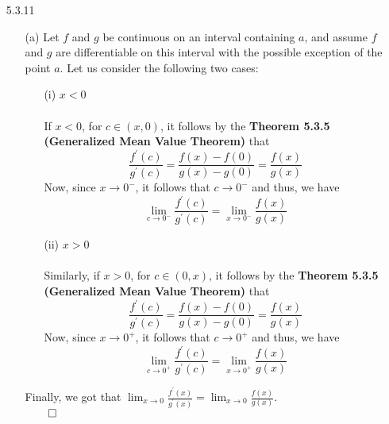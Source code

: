 \documentclass[11pt]{article}
\begin{document}
\begin{itemize}
    \newpage

    \item[5.3.11]
        \begin{itemize}
            \item[(a)]
                Let $f$ and $g$ be continuous on an interval containing $a$,
                and assume $f$ and $g$ are differentiable on this interval with
                the possible exception of the point $a$. Let us consider the
                following two cases:
                \begin{itemize}
                    \item[(i)]
                        $x < 0$
                        \\
                        \\
                        If $x < 0$, for $c \in (x, 0)$, it follows by the
                        \textbf{Theorem 5.3.5 (Generalized Mean Value Theorem)}
                        that
                        \begin{equation*}
                            \frac{f^\prime(c)}{g^\prime(c)} = \frac{f(x) - f(0)}{g(x) - g(0)}
                                                            = \frac{f(x)}{g(x)}
                        \end{equation*}
                        Now, since $x \to 0^-$, it follows that $c \to 0^-$ and
                        thus, we have
                        \begin{equation*}
                            \lim_{c \to 0^-}{\frac{f^\prime(c)}{g^\prime(c)}} = \lim_{x \to 0^-}{\frac{f(x)}{g(x)}}
                        \end{equation*}

                    \item[(ii)]
                        $x > 0$
                        \\
                        \\
                        Similarly, if $x > 0$, for $c \in (0, x)$, it follows
                        by the \textbf{Theorem 5.3.5 (Generalized Mean Value
                        Theorem)} that
                        \begin{equation*}
                            \frac{f^\prime(c)}{g^\prime(c)} = \frac{f(x) - f(0)}{g(x) - g(0)}
                                                            = \frac{f(x)}{g(x)}
                        \end{equation*}
                        Now, since $x \to 0^+$, it follows that $c \to 0^+$ and
                        thus, we have
                        \begin{equation*}
                            \lim_{c \to 0^+}{\frac{f^\prime(c)}{g^\prime(c)}} = \lim_{x \to 0^+}{\frac{f(x)}{g(x)}}
                        \end{equation*}
                \end{itemize}
                Finally, we got that $\lim_{x \to
                0}{\frac{f^\prime(x)}{g^\prime(x)}} = \lim_{x \to
                0}\frac{f(x)}{g(x)}$.\\
                $\qed$
        \end{itemize}
\end{itemize}

\end{document}
